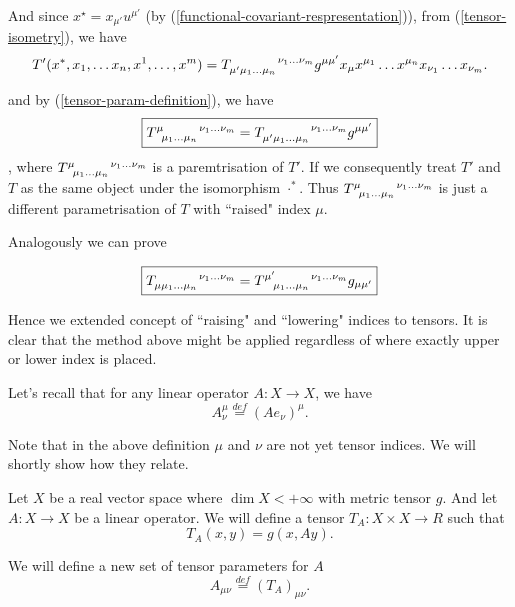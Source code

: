 \documentclass[main.tex]{subfiles}
\begin{document}
And since $x^\star = x_{\mu'} u^{\mu'}$ (by (\ref{functional-covariant-respresentation})), from (\ref{tensor-isometry}), we have
\begin{equation}
T'(x^*, x_1, \dots x_n, x^1, \dots, x^m) = \tensor{{T}}{_{\mu'}_{\mu_1\dots\mu_n}^{\nu_1\dots\nu_m}} g^{\mu \mu'} x_{\mu} x^{\mu_1} \dots x^{\mu_n} x_{\nu_1} \dots x_{\nu_m}.
\end{equation}

and by (\ref{tensor-param-definition}), we have
\begin{equation}
\boxed{
\tensor{T}{^\mu_{\mu_1\dots\mu_n}^{\nu_1\dots\nu_m}}  = \tensor{T}{_{\mu'}_{\mu_1\dots\mu_n}^{\nu_1\dots\nu_m}} g^{\mu \mu'}
}
\end{equation}, 
where
$\tensor{T}{^\mu_{\mu_1\dots\mu_n}^{\nu_1\dots\nu_m}}$ is a paremtrisation of $T'$. If we consequently treat $T'$ and $T$ as the same object under the isomorphism $\cdot^*$. Thus 
$\tensor{T}{^\mu_{\mu_1\dots\mu_n}^{\nu_1\dots\nu_m}}$ is just a different parametrisation of $T$ with ``raised" index $\mu$.

Analogously we can prove

\begin{equation}
\boxed{
\tensor{T}{_\mu_{\mu_1\dots\mu_n}^{\nu_1\dots\nu_m}}  = \tensor{T}{^{\mu'}_{\mu_1\dots\mu_n}^{\nu_1\dots\nu_m}} g_{\mu \mu'}
}
\end{equation}

Hence we extended concept of ``raising" and ``lowering" indices to tensors. It is clear that the method above might be applied regardless of where exactly upper or lower index is placed.

Let's recall that for any linear operator $A: X \to X$, we have
\begin{equation}
A^\mu_\nu \stackrel{def}{=}(Ae_\nu)^\mu.
\end{equation} 

Note that in the above definition $\mu$ and $\nu$ are not yet tensor indices. We will shortly show how they relate.

\begin{definition}
Let $X$ be a real vector space where $\dim X < +\infty$ with metric tensor $g$. And let $A:X\to X$ be a linear operator. We will define a tensor $T_A: X\times X\to R$ such that
\begin{equation}
T_A(x, y) = g(x, Ay).
\end{equation}
\end{definition}  

We will define a new set of tensor parameters for $A$
\begin{equation}
A_{\mu\nu} \stackrel{def}{=} (T_A)_{\mu\nu}.
\end{equation}
\end{document}
